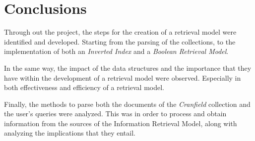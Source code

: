 \documentclass{article}
\begin{document}
\section{Conclusions}

Through out the project, the steps for the creation of a retrieval model were identified and developed. Starting from the parsing of the collections, to the implementation of both an \textit{Inverted Index} and a \textit{Boolean Retrieval Model}.

In the same way, the impact of the data structures and the importance that they have within the development of a retrieval model were observed. Especially in both effectiveness and efficiency of a retrieval model.

Finally, the methods to parse both the documents of the \textit{Cranfield} collection and the user's queries were analyzed. This was in order to process and obtain information from the sources of the Information Retrieval Model, along with analyzing the implications that they entail.

\end{document}
